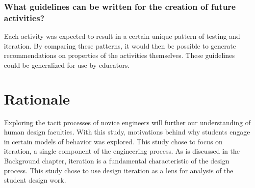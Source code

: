 \subsubsection{What guidelines can be written for the creation of future activities?}
	Each activity was expected to result in a certain unique pattern of testing and iteration. By comparing these patterns, it would then be possible to generate recommendations on properties of the activities themselves. These guidelines could be generalized for use by educators.

\section{Rationale}
Exploring the tacit processes of novice engineers will further our understanding of human design faculties. With this study, motivations behind why students engage in certain models of behavior was explored. This study chose to focus on iteration, a single component of the engineering process. As is discussed in the Background chapter, iteration is a fundamental characteristic of the design process. This study chose to use design iteration as a lens for analysis of the student design work.



